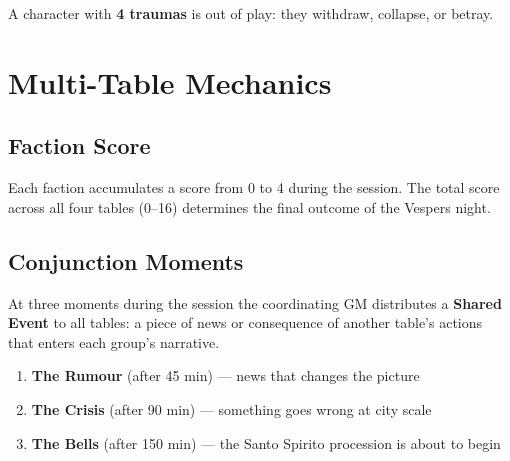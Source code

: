 A character with \textbf{4 traumas} is out of play: they withdraw,
collapse, or betray.



\secsep

\section{Multi-Table Mechanics}

\subsection{Faction Score}

Each faction accumulates a score from 0 to 4 during the session.
The total score across all four tables (0--16) determines the final
outcome of the Vespers night.


\subsection{Conjunction Moments}

At three moments during the session the coordinating GM distributes a
\textbf{Shared Event} to all tables: a piece of news or consequence of
another table's actions that enters each group's narrative.

\begin{enumerate}[nosep]
  \item \textbf{The Rumour} (after 45 min) --- news that changes the picture
  \item \textbf{The Crisis} (after 90 min) --- something goes wrong at city scale
  \item \textbf{The Bells} (after 150 min) --- the Santo Spirito procession
    is about to begin
\end{enumerate}

